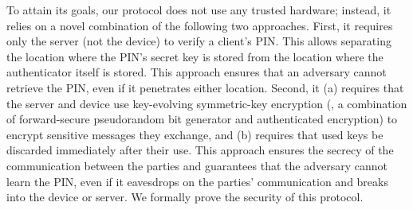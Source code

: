 To attain its goals, our protocol does not use any trusted hardware; instead, it relies on a novel combination of the following two approaches. First, it requires only the server  (not the device) to verify a client’s PIN. This allows separating the location where the PIN’s secret key is stored from the location where the authenticator itself is stored. This approach ensures that an adversary cannot retrieve the PIN, even if it penetrates either location.  Second, it  (a) requires that the server and device use key-evolving symmetric-key encryption (\ie, a combination of forward-secure pseudorandom bit generator and authenticated encryption) to encrypt sensitive messages they exchange,  and (b) requires that used keys be discarded immediately after their use. This approach ensures the secrecy of the communication between the parties and guarantees that the adversary cannot learn the PIN, even if it eavesdrops on the parties' communication and breaks into the device or server. We formally prove the security of this protocol. 





%
%





% 





